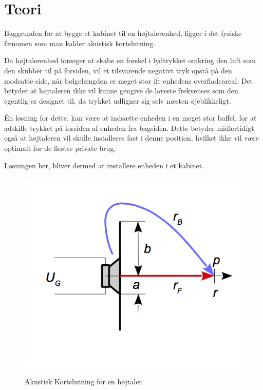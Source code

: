 \chapter{Teori}
\label{chapt:Teori}

Baggrunden for at bygge et kabinet til en højtalerenhed, ligger i det fysiske fænomen som man kalder akustisk kortslutning. 

Da højtalerenhed forsøger at skabe en forskel i lydtrykket omkring den luft som den skubber til på forsiden, vil et tilsvarende negativt tryk opstå på den modsatte side, når bølgelængden er meget stor ift enhedens overfladeareal. Det betyder at højtaleren ikke vil kunne gengive de laveste frekvenser som den egentlig er designet til, da trykket udligner sig selv næsten øjeblikkeligt. 

Én løsning for dette, kan være at indsætte enheden i en meget stor baffel, for at adskille trykket på forsiden af enheden fra bagsiden. Dette betyder midlertidigt også at højtaleren vil skulle installeres fast i denne position, hvilket ikke vil være optimalt for de flestes private brug. 

Løsningen her, bliver dermed at installere enheden i et kabinet. 



\begin{figure}[h!]
	\centering
	\includegraphics[trim={0 1.5cm 0 1cm}, clip=true,width=.4\textwidth]{Pics/kortslutning}
	\label{fig:kortslutning}
	\caption{Akustisk Kortslutning for en højtaler \cite{Elektroakustik}}
\end{figure}



